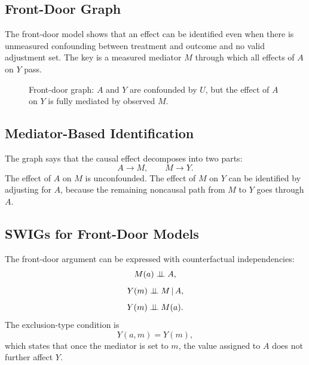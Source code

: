 \label{lec:9-7}

\subsection{Front-Door Graph}

The front-door model shows that an effect can be identified even when there is
unmeasured confounding between treatment and outcome and no valid adjustment
set. The key is a measured mediator $M$ through which all effects of $A$ on $Y$
pass.

\begin{figure}[H]
\centering
{}
\caption{Front-door graph: $A$ and $Y$ are confounded by $U$, but the effect of $A$ on $Y$ is fully mediated by observed $M$.}
\label{fig:ch9-frontdoor}
\end{figure}

\subsection{Mediator-Based Identification}

The graph says that the causal effect decomposes into two parts:
\[
  A\rightarrow M,\qquad M\rightarrow Y.
\]
The effect of $A$ on $M$ is unconfounded. The effect of $M$ on $Y$ can be
identified by adjusting for $A$, because the remaining noncausal path from $M$
to $Y$ goes through $A$.

\subsection{SWIGs for Front-Door Models}

The front-door argument can be expressed with counterfactual independencies:
\[
  M(a)\perp\!\!\!\perp A,
\]
\[
  Y(m)\perp\!\!\!\perp M\,\vert\, A,
\]
\[
  Y(m)\perp\!\!\!\perp M(a).
\]
The exclusion-type condition is
\[
  Y(a,m)=Y(m),
\]
which states that once the mediator is set to $m$, the value assigned to $A$
does not further affect $Y$.

